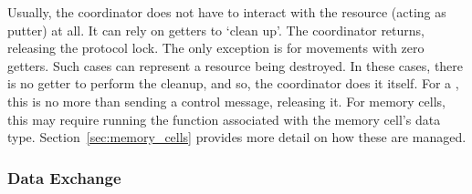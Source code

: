 \begin{enumerate}
	Usually, the coordinator does not have to interact with the resource (acting as putter) at all. It can rely on getters to `clean up'. The coordinator returns, releasing the protocol lock. The only exception is for movements with zero getters. Such cases can represent a resource being destroyed. In these cases, there is no getter to perform the cleanup, and so, the coordinator does it itself. For a , this is no more than sending a control message, releasing it. For memory cells, this may require running the  function associated with the memory cell's data type.  Section~\ref{sec:memory_cells} provides more detail on how these are managed.
	
\end{enumerate}

\subsubsection{Data Exchange}
\label{sec:data_exchange}

